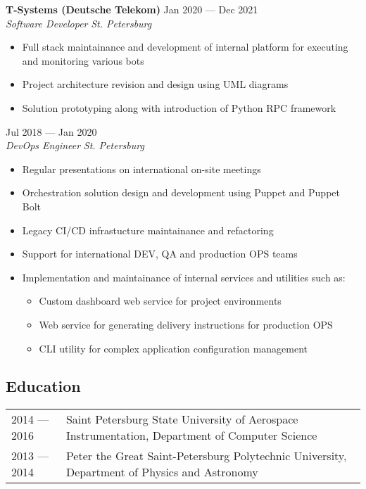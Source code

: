 \documentclass[10pt]{report}
\newenvironment{JobDescription}[5]{
    \vspace{ #5 }
    \flushleft
    {\bf #1 } \hfill { #2 }
    \\
    {\em #3 } \hfill {\em #4 }
    \begin{itemize}
} {
    \end{itemize}
}
\begin{document}
\goodbreak

\begin{JobDescription}{T-Systems (Deutsche Telekom)}{Jan 2020 --- Dec 2021}{Software Developer}{St. Petersburg}{0mm}
    \item Full stack maintainance and development of internal platform for executing and monitoring various bots
    \item Project architecture revision and design using UML diagrams
    \item Solution prototyping along with introduction of Python RPC framework
\end{JobDescription}

\begin{JobDescription}{}{Jul 2018 --- Jan 2020}{DevOps Engineer}{St. Petersburg}{-3mm}
    \item Regular presentations on international on-site meetings
    \item Orchestration solution design and development using Puppet and Puppet Bolt
    \item Legacy CI/CD infrastucture maintainance and refactoring
    \item Support for international DEV, QA and production OPS teams
    \item Implementation and maintainance of internal services and utilities such as:
    \begin{itemize}
        \item Custom dashboard web service for project environments
        \item Web service for generating delivery instructions for production OPS
        \item CLI utility for complex application configuration management
    \end{itemize}
\end{JobDescription}

\vspace{5mm}

\subsection*{Education}
\begin{table}[H]
    \begin{tabular}{@{}p{}p{}}
        2014 --- 2016 & Saint Petersburg State University of Aerospace Instrumentation, Department of Computer Science \\
        2013 --- 2014 & Peter the Great Saint-Petersburg Polytechnic University, Department of Physics and Astronomy
    \end{tabular}
\end{table}
\end{document}
